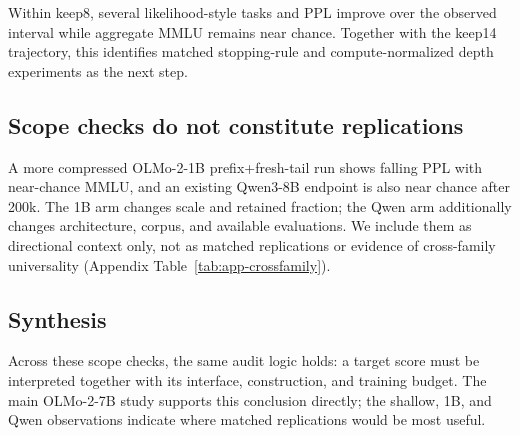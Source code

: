 Within keep8, several likelihood-style tasks and PPL improve over the observed
interval while aggregate MMLU remains near chance. Together with the keep14
trajectory, this identifies matched stopping-rule and compute-normalized depth
experiments as the next step.

\subsection{Scope checks do not constitute replications}
A more compressed OLMo-2-1B prefix+fresh-tail run shows falling PPL with
near-chance MMLU, and an existing Qwen3-8B endpoint is also near chance after
200k. The 1B arm changes scale and retained fraction; the Qwen arm additionally
changes architecture, corpus, and available evaluations. We include them as
directional context only, not as matched replications or evidence of
cross-family universality (Appendix Table~\ref{tab:app-crossfamily}).

\subsection{Synthesis}
Across these scope checks, the same audit logic holds: a target score must be
interpreted together with its interface, construction, and training budget.
The main OLMo-2-7B study supports this conclusion directly; the shallow, 1B,
and Qwen observations indicate where matched replications would be most useful.

